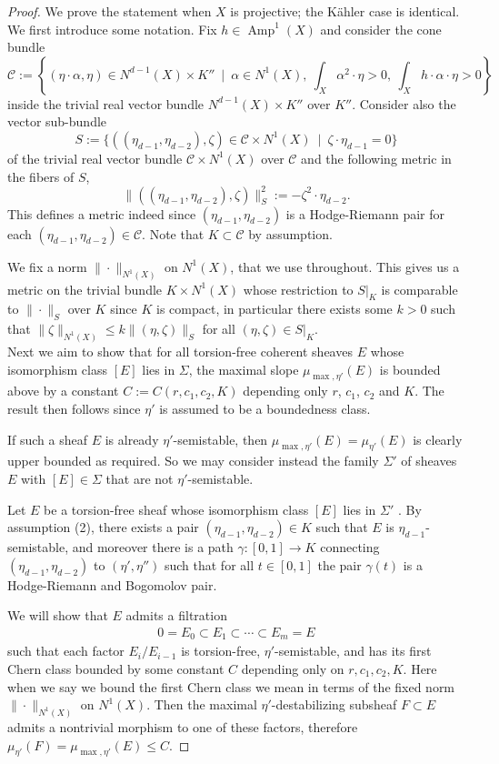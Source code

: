 \documentclass[10pt,a4paper]{amsart}
\DeclareMathOperator{\Amp}{Amp}
\def\cC{\mathcal C }
\begin{document}
\begin{proof}
We prove the statement when $X$ is projective; the K\"ahler case is identical. We first introduce some notation. Fix $h\in \Amp^1(X)$ and consider the cone bundle 
$$\cC:=\left\{(\eta\cdot \alpha, \eta)\in  N^{d-1}(X)\times K'' \ \mid \ \alpha\in N^1(X), \ \int_X \alpha^2\cdot\eta>0, \ \int_X h\cdot \alpha\cdot\eta>0\right \}$$ 
inside the trivial real vector bundle $N^{d-1}(X)\times K''$ over $K''$. Consider also the vector sub-bundle 
$$S:=\{ ((\eta_{d-1},\eta_{d-2}),\zeta)\in \cC\times N^1(X) \ \mid \ \zeta \cdot \eta_{d-1}=0\}$$
of the trivial real vector bundle $\cC\times N^{1}(X)$ over $\cC$
and the following metric in the fibers of $S$, 
$$ \| ((\eta_{d-1},\eta_{d-2}),\zeta)\|_S^2:=-\zeta^2\cdot\eta_{d-2}.$$
This defines a metric indeed since $(\eta_{d-1},\eta_{d-2})$ is a Hodge-Riemann pair for each $(\eta_{d-1},\eta_{d-2}) \in \cC$. Note that $K\subset \cC$ by assumption. 

We fix a norm $\| \cdot \|_{N^1(X)}$ on $N^1(X)$, that we use throughout. This gives us a metric on the trivial  bundle $K\times N^1(X)$ whose  restriction to $S|_{K}$ is comparable to $\|\cdot \|_{S}$ over $K$ since $K$ is compact, in particular there exists some $k>0$ such that $\| \zeta \|_{N^1(X)}\le k\|  (\eta,\zeta)\|_S$  for all $(\eta,\zeta)\in S|_{K}$.\\

Next we aim to show that for all torsion-free coherent sheaves $E$ whose isomorphism class $[E]$ lies in $\Sigma$, the maximal slope $\mu_{\max,\eta'}(E)$ is bounded above by a constant $C := C(r,c_1,c_2,K)$ depending only $r$, $c_1$, $c_2$ and $K$. The result then follows since $\eta'$ is assumed to be a boundedness class. 

If such a sheaf $E$ is already $\eta'$-semistable, then $\mu_{\max,\eta'}(E) = \mu_{\eta'}(E)$ is clearly upper bounded as required. So we may consider instead the family $\Sigma'$ of sheaves $E$ with $[E] \in \Sigma$ that are not $\eta'$-semistable.

Let $E$ be a torsion-free sheaf whose isomorphism class $[E]$ lies in $\Sigma'$ . By assumption (2), there exists a pair $(\eta_{d-1},\eta_{d-2}) \in K$ such that $E$ is $\eta_{d-1}$-semistable, and moreover there is a path $\gamma : [0,1] \to K$ connecting $(\eta_{d-1},\eta_{d-2})$ to $(\eta',\eta'')$ such that for all $t \in [0,1]$ the pair $\gamma(t)$ is a Hodge-Riemann and Bogomolov pair. 

We will show that $E$ admits a filtration
\begin{align*}
     0 = E_0 \subset E_1 \subset \cdots \subset E_m =E
\end{align*}
such that each factor $E_i/E_{i-1}$ is torsion-free, $\eta'$-semistable, and has its first Chern class bounded by some constant $C$ depending only on $r, c_1, c_2, K$. Here when we say we bound the first Chern class we mean in terms of the fixed norm $\| \cdot \|_{N^1(X)}$ on $N^1(X)$. Then the maximal $\eta'$-destabilizing subsheaf $F \subset E$ admits a nontrivial morphism to one of these factors, therefore $\mu_{\eta'}(F) = \mu_{\max,\eta'}(E) \le C$. 


\end{proof}
\end{document}
